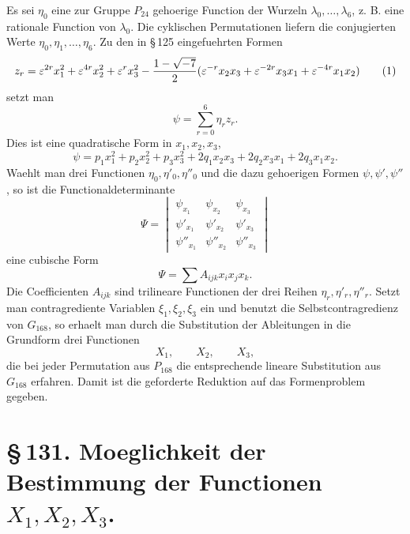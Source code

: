\documentclass[11pt]{article}
\providecommand{\eps}{\varepsilon}
\providecommand{\eps}{\varepsilon}
\begin{document}
Es sei \(\eta_0\) eine zur Gruppe \(P_{24}\) gehoerige Function der Wurzeln \(\lambda_0,\ldots,\lambda_6\), z. B. eine rationale Function von \(\lambda_0\). Die cyklischen Permutationen liefern die conjugierten Werte \(\eta_0,\eta_1,
\ldots,\eta_6\). Zu den in \S\,125 eingefuehrten Formen
\begin{equation}
z_r=\eps^{2r}x_1^2+\eps^{4r}x_2^2+
\eps^r x_3^2-{1-\sqrt{-7}\over2}(\eps^{-r}x_2x_3+\eps^{-2r}x_3x_1+\eps^{-4r}x_1x_2)
\tag{1}
\end{equation}
setzt man
\begin{equation}
\psi=\sum_{r=0}^6\eta_r z_r.
\tag{2}
\end{equation}
Dies ist eine quadratische Form in \(x_1,x_2,x_3\),
\begin{equation}
\psi=p_1x_1^2+p_2x_2^2+p_3x_3^2+2q_1x_2x_3+2q_2x_3x_1+2q_3x_1x_2.
\tag{3}
\end{equation}
Waehlt man drei Functionen \(\eta_0,\eta'_0,\eta''_0\) und die dazu gehoerigen Formen \(\psi,\psi',\psi''\), so ist die Functionaldeterminante
\begin{equation}
\Psi=
\begin{vmatrix}
\psi_{x_1}&\psi_{x_2}&\psi_{x_3}\\
\psi'_{x_1}&\psi'_{x_2}&\psi'_{x_3}\\
\psi''_{x_1}&\psi''_{x_2}&\psi''_{x_3}
\end{vmatrix}
\tag{4}
\end{equation}
eine cubische Form
\begin{equation}
\Psi=\sum A_{ijk}x_ix_jx_k.
\tag{5}
\end{equation}
Die Coefficienten \(A_{ijk}\) sind trilineare Functionen der drei Reihen \(\eta_r,\eta'_r,\eta''_r\). Setzt man contragrediente Variablen \(\xi_1,\xi_2,\xi_3\) ein und benutzt die Selbstcontragredienz von \(G_{168}\), so erhaelt man durch die Substitution der Ableitungen in die Grundform drei Functionen
\begin{equation}
X_1,
\qquad X_2,
\qquad X_3,
\tag{6}
\end{equation}
die bei jeder Permutation aus \(P_{168}\) die entsprechende lineare Substitution aus \(G_{168}\) erfahren. Damit ist die geforderte Reduktion auf das Formenproblem gegeben.

\section*{\S\,131. Moeglichkeit der Bestimmung der Functionen \(X_1,X_2,X_3\).}
\end{document}
